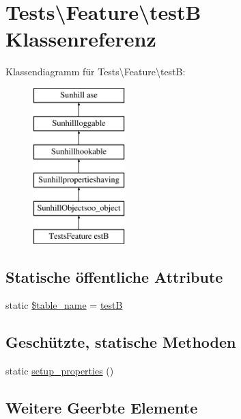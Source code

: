 \hypertarget{classTests_1_1Feature_1_1testB}{}\section{Tests\textbackslash{}Feature\textbackslash{}testB Klassenreferenz}
\label{classTests_1_1Feature_1_1testB}
Klassendiagramm für Tests\textbackslash{}Feature\textbackslash{}testB\+:\begin{figure}[H]
\begin{center}
\leavevmode
\includegraphics[height=6.000000cm]{dc/dc2/classTests_1_1Feature_1_1testB}
\end{center}
\end{figure}
\subsection*{Statische öffentliche Attribute}
\begin{DoxyCompactItemize}
\item 
static \hyperlink{classTests_1_1Feature_1_1testB_aa08df803ebd58225666f68e3c2bbb865}{\$table\+\_\+name} = \textquotesingle{}\hyperlink{classTests_1_1Feature_1_1testB}{testB}\textquotesingle{}
\end{DoxyCompactItemize}
\subsection*{Geschützte, statische Methoden}
\begin{DoxyCompactItemize}
\item 
static \hyperlink{classTests_1_1Feature_1_1testB_a2e94887e97f3c0af6b94a487164a5590}{setup\+\_\+properties} ()
\end{DoxyCompactItemize}
\subsection*{Weitere Geerbte Elemente}


